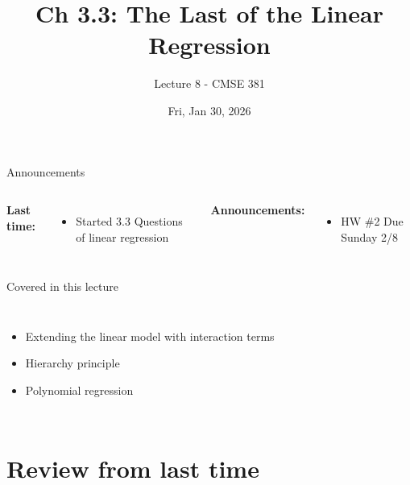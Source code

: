 \documentclass[aspectratio=169,usenames,dvipsnames]{beamer}
\begin{document}
\title[]{Ch 3.3: The Last of the Linear Regression}
\subtitle{Lecture 8 - CMSE 381}
\date{Fri, Jan 30, 2026}





\begin{frame}
 \titlepage


\end{frame}
\begin{frame}[c]{Announcements}

\begin{columns}
\centering

	\textbf{Last time:}
	\begin{itemize}
		\item Started 3.3 Questions of linear regression
	\end{itemize}
\centering

\textbf{Announcements:}
	\begin{itemize}
		\item HW \#2 Due Sunday 2/8
	\end{itemize}
\end{columns}

\end{frame}
\begin{frame}[c]{Covered in this lecture }

\begin{columns}
\centering
\begin{itemize}
	\item Extending the linear model with interaction terms
	\item Hierarchy principle
	\item Polynomial regression
\end{itemize}
\centering

\end{columns}

\end{frame}
\section{Review from last time }
\end{document}
